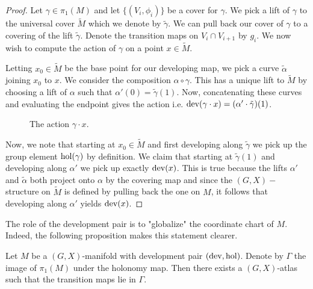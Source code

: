 \begin{proof}
    Let $\gamma \in \pi_1(M)$ and let $\{(V_i, \phi_i)\}$ be a cover for $\gamma$. We pick a lift of $\gamma$ to the universal cover $\tilde{M}$ which we denote by
    $\tilde{\gamma}$. We can pull back our cover of $\gamma$ to a covering of the lift $\tilde{\gamma}$. Denote the transition maps on $V_i \cap V_{i+1}$ by $g_i$.
    We now wish to compute the action of $\gamma$ on a point $x \in \tilde{M}$.

    Letting $x_0\in \tilde{M}$ be the base point for our developing map, we pick a
    curve $\tilde{\alpha}$ joining $x_0$ to $x$. We consider the composition
    $\alpha \circ \gamma$. This has a unique lift to $\tilde{M}$ by choosing a lift
    of $\alpha$ such that $\alpha'(0) = \tilde{\gamma}(1)$. Now, concatenating
    these curves and evaluating the endpoint gives the action i.e. $\text{dev}(\gamma
        \cdot x) = (\alpha' \cdot \tilde{\gamma})(1)$.

    \begin{figure}[H]
        \centering
        \caption{The action $\gamma \cdot x$.}
    \end{figure}

    Now, we note that starting at $x_0 \in \tilde{M}$ and first developing along
    $\tilde{\gamma}$ we pick up the group element $\text{hol}(\gamma)$ by definition. We
    claim that starting at $\tilde{\gamma}(1)$ and developing along $\alpha'$ we
    pick up exactly $\text{dev}(x)$. This is true because the lifts $\alpha'$ and
    $\tilde{\alpha}$ both project onto $\alpha$ by the covering map and since the
    $(G,X)-$structure on $\tilde{M}$ is defined by pulling back the one on $M$, it
    follows that developing along $\alpha'$ yields $\text{dev}(x)$.
\end{proof}

The role of the development pair is to "globalize" the coordinate chart of $M$.
Indeed, the following proposition makes this statement clearer.

\begin{prop}
    Let $M$ be a $(G,X)$-manifold with development pair $(\text{dev}, \text{hol})$. Denote
    by $\Gamma$ the image of $\pi_1(M)$ under the holonomy map. Then there
    exists a $(G,X)$-atlas such that the transition maps lie in $\Gamma$. \label{prop:dev-charts}
\end{prop}

